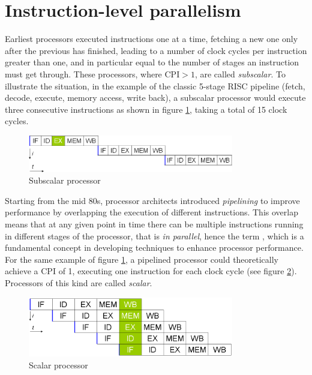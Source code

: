 \section{Instruction-level parallelism}\label{sec:ilp}
Earliest processors executed instructions one at a time, fetching a new one only after the previous has finished, leading to a number of clock cycles per instruction greater than one, and in particular equal to the number of stages an instruction must get through. These processors, where $\text{CPI} > 1$, are called \emph{subscalar}. To illustrate the situation, in the example of the classic 5-stage RISC pipeline (fetch, decode, execute, memory access, write back), a subscalar processor would execute three consecutive instructions as shown in figure \ref{fig:subscalar}, taking a total of 15 clock cycles.

\begin{figure}[hbt]
  \centering
  \includegraphics[width=0.8\textwidth]{img/subscalar.png}
  \caption[Subscalar processor]{Subscalar processor\footnotemark}
  \label{fig:subscalar}
\end{figure}

Starting from the mid 80s, processor architects introduced \emph{pipelining} to improve performance by overlapping the execution of different instructions. This overlap means that at any given point in time there can be multiple instructions running in different stages of the processor, that is \emph{in parallel}, hence the term , which is a fundamental concept in developing techniques to enhance processor performance. For the same example of figure \ref{fig:subscalar}, a pipelined processor could theoretically achieve a \ac{CPI} of 1, executing one instruction for each clock cycle (see figure \ref{fig:scalar}). Processors of this kind are called \emph{scalar}.

\begin{figure}[hbt]
  \centering
  \includegraphics[width=0.8\textwidth]{img/scalar.png}
  \caption[Scalar processor]{Scalar processor\footnotemark}
  \label{fig:scalar}
\end{figure}

